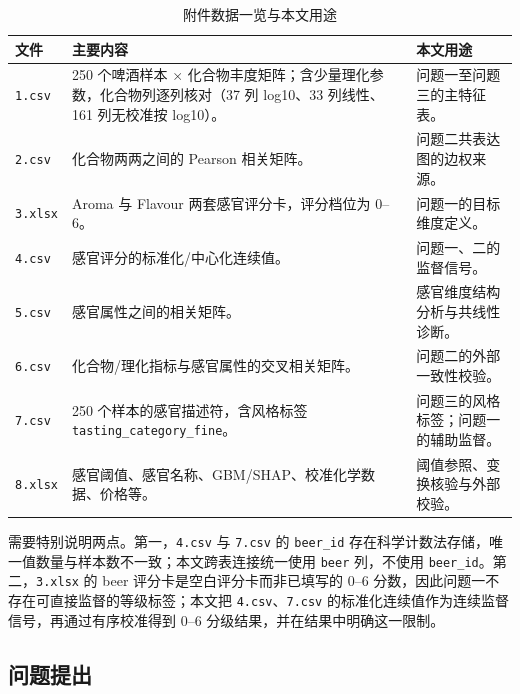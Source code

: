 \begin{table}[htbp]
  \centering
  \caption{附件数据一览与本文用途}
  \label{tab:data-overview}
  \small
  \begin{tabularx}{\textwidth}{@{}l X X@{}}
    \toprule
    文件 & 主要内容 & 本文用途 \\
    \midrule
    \texttt{1.csv} & 250 个啤酒样本 $\times$ 化合物丰度矩阵；含少量理化参数，化合物列逐列核对（37 列 log10、33 列线性、161 列无校准按 log10）。 & 问题一至问题三的主特征表。 \\
    \texttt{2.csv} & 化合物两两之间的 Pearson 相关矩阵。 & 问题二共表达图的边权来源。 \\
    \texttt{3.xlsx} & Aroma 与 Flavour 两套感官评分卡，评分档位为 0--6。 & 问题一的目标维度定义。 \\
    \texttt{4.csv} & 感官评分的标准化/中心化连续值。 & 问题一、二的监督信号。 \\
    \texttt{5.csv} & 感官属性之间的相关矩阵。 & 感官维度结构分析与共线性诊断。 \\
    \texttt{6.csv} & 化合物/理化指标与感官属性的交叉相关矩阵。 & 问题二的外部一致性校验。 \\
    \texttt{7.csv} & 250 个样本的感官描述符，含风格标签 \texttt{tasting\_category\_fine}。 & 问题三的风格标签；问题一的辅助监督。 \\
    \texttt{8.xlsx} & 感官阈值、感官名称、GBM/SHAP、校准化学数据、价格等。 & 阈值参照、变换核验与外部校验。 \\
    \bottomrule
  \end{tabularx}
\end{table}

需要特别说明两点。第一，\texttt{4.csv} 与 \texttt{7.csv} 的 \texttt{beer\_id} 存在科学计数法存储，唯一值数量与样本数不一致；本文跨表连接统一使用 \texttt{beer} 列，不使用 \texttt{beer\_id}。第二，\texttt{3.xlsx} 的 beer 评分卡是空白评分卡而非已填写的 0--6 分数，因此问题一不存在可直接监督的等级标签；本文把 \texttt{4.csv}、\texttt{7.csv} 的标准化连续值作为连续监督信号，再通过有序校准得到 0--6 分级结果，并在结果中明确这一限制。

\subsection{问题提出}

